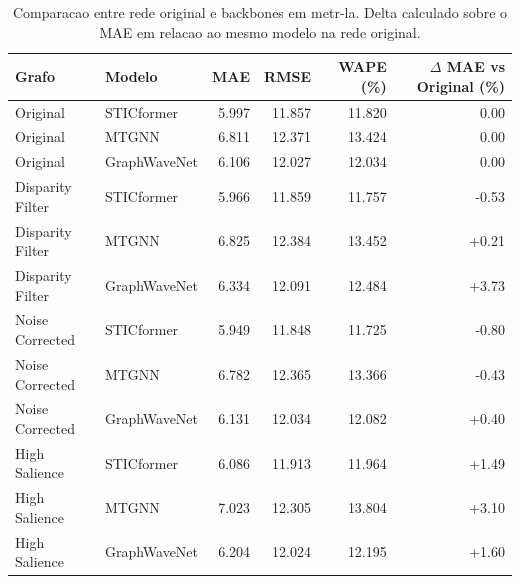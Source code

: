 
\begin{table}[ht]
\centering
\caption{Comparacao entre rede original e backbones em metr-la. Delta calculado sobre o MAE em relacao ao mesmo modelo na rede original.}
\label{tab:metr-la-original-backbones}
\begin{tabular}{llrrrr}
\toprule
Grafo & Modelo & MAE & RMSE & WAPE (\%) & $\Delta$ MAE vs Original (\%) \\
\midrule
Original & STICformer & 5.997 & 11.857 & 11.820 & 0.00 \\
Original & MTGNN & 6.811 & 12.371 & 13.424 & 0.00 \\
Original & GraphWaveNet & 6.106 & 12.027 & 12.034 & 0.00 \\
Disparity Filter & STICformer & 5.966 & 11.859 & 11.757 & -0.53 \\
Disparity Filter & MTGNN & 6.825 & 12.384 & 13.452 & +0.21 \\
Disparity Filter & GraphWaveNet & 6.334 & 12.091 & 12.484 & +3.73 \\
Noise Corrected & STICformer & 5.949 & 11.848 & 11.725 & -0.80 \\
Noise Corrected & MTGNN & 6.782 & 12.365 & 13.366 & -0.43 \\
Noise Corrected & GraphWaveNet & 6.131 & 12.034 & 12.082 & +0.40 \\
High Salience & STICformer & 6.086 & 11.913 & 11.964 & +1.49 \\
High Salience & MTGNN & 7.023 & 12.305 & 13.804 & +3.10 \\
High Salience & GraphWaveNet & 6.204 & 12.024 & 12.195 & +1.60 \\
\bottomrule
\end{tabular}
\end{table}

